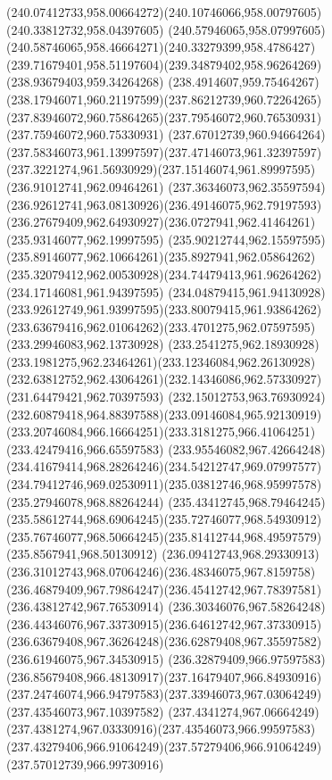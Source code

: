 {{  \curveto(240.07412733,958.00664272)(240.10746066,958.00797605)(240.33812732,958.04397605)
  \curveto(240.57946065,958.07997605)(240.58746065,958.46664271)(240.33279399,958.4786427)
  \curveto(239.71679401,958.51197604)(239.34879402,958.96264269)(238.93679403,959.34264268)
  \curveto(238.4914607,959.75464267)(238.17946071,960.21197599)(237.86212739,960.72264265)
  \curveto(237.83946072,960.75864265)(237.79546072,960.76530931)(237.75946072,960.75330931)
  \curveto(237.67012739,960.94664264)(237.58346073,961.13997597)(237.47146073,961.32397597)
  \curveto(237.3221274,961.56930929)(237.15146074,961.89997595)(236.91012741,962.09464261)
  \curveto(237.36346073,962.35597594)(236.92612741,963.08130926)(236.49146075,962.79197593)
  \curveto(236.27679409,962.64930927)(236.0727941,962.41464261)(235.93146077,962.19997595)
  \curveto(235.90212744,962.15597595)(235.89146077,962.10664261)(235.8927941,962.05864262)
  \curveto(235.32079412,962.00530928)(234.74479413,961.96264262)(234.17146081,961.94397595)
  \curveto(234.04879415,961.94130928)(233.92612749,961.93997595)(233.80079415,961.93864262)
  \curveto(233.63679416,962.01064262)(233.4701275,962.07597595)(233.29946083,962.13730928)
  \curveto(233.2541275,962.18930928)(233.1981275,962.23464261)(233.12346084,962.26130928)
  \curveto(232.63812752,962.43064261)(232.14346086,962.57330927)(231.64479421,962.70397593)
  \curveto(232.15012753,963.76930924)(232.60879418,964.88397588)(233.09146084,965.92130919)
  \curveto(233.20746084,966.16664251)(233.3181275,966.41064251)(233.42479416,966.65597583)
  \curveto(233.95546082,967.42664248)(234.41679414,968.28264246)(234.54212747,969.07997577)
  \curveto(234.79412746,969.02530911)(235.03812746,968.95997578)(235.27946078,968.88264244)
  \curveto(235.43412745,968.79464245)(235.58612744,968.69064245)(235.72746077,968.54930912)
  \curveto(235.76746077,968.50664245)(235.81412744,968.49597579)(235.8567941,968.50130912)
  \curveto(236.09412743,968.29330913)(236.31012743,968.07064246)(236.48346075,967.8159758)
  \curveto(236.46879409,967.79864247)(236.45412742,967.78397581)(236.43812742,967.76530914)
  \curveto(236.30346076,967.58264248)(236.44346076,967.33730915)(236.64612742,967.37330915)
  \curveto(236.63679408,967.36264248)(236.62879408,967.35597582)(236.61946075,967.34530915)
  \curveto(236.32879409,966.97597583)(236.85679408,966.48130917)(237.16479407,966.84930916)
  \curveto(237.24746074,966.94797583)(237.33946073,967.03064249)(237.43546073,967.10397582)
  \curveto(237.4341274,967.06664249)(237.4381274,967.03330916)(237.43546073,966.99597583)
  \curveto(237.43279406,966.91064249)(237.57279406,966.91064249)(237.57012739,966.99730916)
}}
